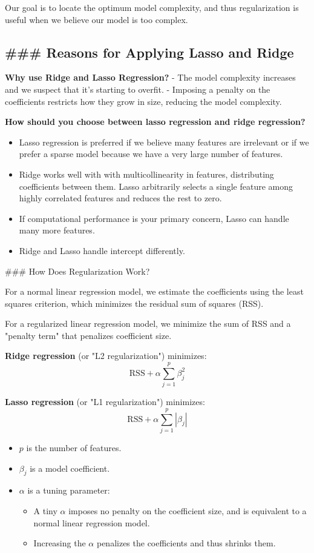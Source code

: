 \documentclass[11pt]{article}
\providecommand{\tightlist}{%
      \setlength{\itemsep}{0pt}\setlength{\parskip}{0pt}}
\begin{document}
Our goal is to locate the optimum model complexity, and thus
regularization is useful when we believe our model is too complex.

\subsection{\#\#\# Reasons for Applying Lasso and
Ridge}\label{reasons-for-applying-lasso-and-ridge}

\textbf{Why use Ridge and Lasso Regression?} - The model complexity
increases and we suspect that it's starting to overfit. - Imposing a
penalty on the coefficients restricts how they grow in size, reducing
the model complexity.

\textbf{How should you choose between lasso regression and ridge
regression?}

\begin{itemize}
\tightlist
\item
  Lasso regression is preferred if we believe many features are
  irrelevant or if we prefer a sparse model because we have a very large
  number of features.
\item
  Ridge works well with with multicollinearity in features, distributing
  coefficients between them. Lasso arbitrarily selects a single feature
  among highly correlated features and reduces the rest to zero.
\item
  If computational performance is your primary concern, Lasso can handle
  many more features.
\item
  Ridge and Lasso handle intercept differently.
\end{itemize}

     \#\#\# How Does Regularization Work?

For a normal linear regression model, we estimate the coefficients using
the least squares criterion, which minimizes the residual sum of squares
(RSS).

    For a regularized linear regression model, we minimize the sum of RSS
and a "penalty term" that penalizes coefficient size.

\textbf{Ridge regression} (or "L2 regularization") minimizes:
\[\text{RSS} + \alpha \sum_{j=1}^p \beta_j^2\]

\textbf{Lasso regression} (or "L1 regularization") minimizes:
\[\text{RSS} + \alpha \sum_{j=1}^p |\beta_j|\]

\begin{itemize}
\tightlist
\item
  \(p\) is the number of features.
\item
  \(\beta_j\) is a model coefficient.
\item
  \(\alpha\) is a tuning parameter:

  \begin{itemize}
  \tightlist
  \item
    A tiny \(\alpha\) imposes no penalty on the coefficient size, and is
    equivalent to a normal linear regression model.
  \item
    Increasing the \(\alpha\) penalizes the coefficients and thus
    shrinks them.
  \end{itemize}
\end{itemize}
\end{document}
